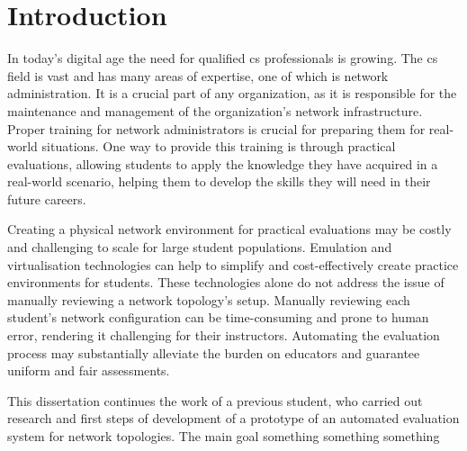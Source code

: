 
\chapter{Introduction}


\label{ChapterIntroduction}


In today's digital age the need for qualified \ac{cs} professionals is growing.
The \ac{cs} field is vast and has many areas of expertise, one of which is network administration.
It is a crucial part of any organization, as it is responsible for the maintenance and management of 
the organization's network infrastructure.
Proper training for network administrators is crucial for preparing them for real-world situations.
One way to provide this training is through practical evaluations, allowing students to apply the knowledge they 
have acquired in a real-world scenario, helping them to develop the skills they will need in their future careers.

Creating a physical network environment for practical evaluations may be costly and challenging to scale for 
large student populations. 
Emulation and virtualisation technologies can help to simplify and cost-effectively create practice environments 
for students. 
These technologies alone do not address the issue of manually reviewing a network topology's setup. 
Manually reviewing each student's network configuration can be time-consuming and prone to human error, rendering 
it challenging for their instructors. Automating the evaluation process may substantially alleviate the burden 
on educators and guarantee uniform and fair assessments.

This dissertation continues the work of a previous student, who carried out research and first steps of development of a 
prototype of an automated evaluation system for network topologies. The main goal something something something